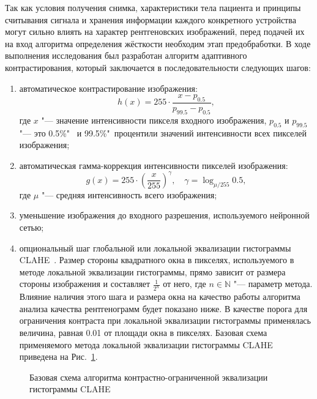 Так как условия получения снимка, характеристики тела пациента и принципы считывания сигнала и хранения информации каждого конкретного устройства могут сильно влиять на характер рентгеновских изображений, перед подачей их на вход алгоритма определения жёсткости необходим этап предобработки. В ходе выполнения исследования был разработан алгоритм адаптивного контрастирования, который заключается в последовательности следующих шагов:
\begin{enumerate}[beginpenalty=10000]
	\item автоматическое контрастирование изображения:
	\begin{equation}
	h \left( x \right) = 255 \cdot \frac{x - p_{0.5}}{p_{99.5} - p_{0.5}}, \nonumber
	\end{equation}
	где $x$ "--- значение интенсивности пикселя входного изображения, $p_{0.5}$ и $p_{99.5}$ "--- это 0.5\%"~ и 99.5\%"~процентили значений интенсивности всех пикселей изображения;
	\item автоматическая гамма-коррекция интенсивности пикселей изображения:
	\begin{equation}
	g \left( x \right) = 255 \cdot {\left( \frac{x}{255} \right)}^{\gamma}, \quad \gamma = \log_{\mu / 255}{0.5}, \nonumber
	\end{equation}
	где $\mu$ "--- средняя интенсивность всего изображения;
	\item уменьшение изображения до входного разрешения, используемого нейронной сетью;
	\item опциональный шаг глобальной или локальной эквализации гистограммы CLAHE~\cite{pizer1987adaptive}. Размер стороны квадратного окна  в пикселях, используемого в методе локальной эквализации гистограммы, прямо зависит от размера стороны изображения и составляет $\frac{1}{2^n}$ от него, где $n\in\mathbb{N}$ "--- параметр метода. Влияние наличия этого шага и размера окна на качество работы алгоритма анализа качества рентгенограмм будет показано ниже. В качестве порога для ограничения контраста при локальной эквализации гистограммы применялась величина, равная 0.01 от площади окна в пикселях. Базовая схема применяемого метода локальной эквализации гистограммы CLAHE приведена на Рис.~\ref{fig:clahe-scheme}.
\end{enumerate}

\begin{figure}[ht]
	\caption{Базовая схема алгоритма контрастно-ограниченной эквализации гистограммы CLAHE}
	\label{fig:clahe-scheme}
\end{figure}


